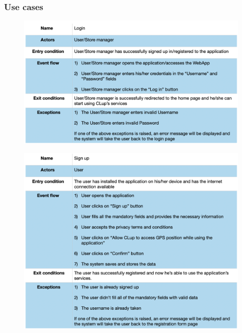 \documentclass{article}
\begin{document}
\subsubsection{Use cases}

\begin{figure}[H]
  \includegraphics[width=\linewidth]{LoginUseCase.png}
  
\end{figure}

\begin{figure}[H]
  \includegraphics[width=\linewidth]{SignUpUseCase.png}
  
\end{figure}
\end{document}
